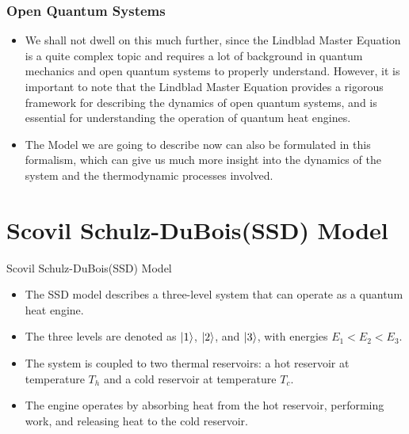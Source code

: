 \documentclass{beamer}
\begin{document}
    \begin{frame}
        \frametitle{Open Quantum Systems}
        \begin{itemize}
             \item We shall not dwell on this much further, since the Lindblad Master Equation is a quite complex topic and requires a lot of background in quantum mechanics and open quantum systems to properly understand. However, it is important to note that the Lindblad Master Equation provides a rigorous framework for describing the dynamics of open quantum systems, and is essential for understanding the operation of quantum heat engines.
             \item The Model we are going to describe now can also be formulated in this formalism, which can give us much more insight into the dynamics of the system and the thermodynamic processes involved.
        \end{itemize}
    \end{frame}



    \section{Scovil Schulz-DuBois(SSD) Model}

    \begin{frame}{Scovil Schulz-DuBois(SSD) Model}
        \begin{itemize}
            \item The SSD model describes a three-level system that can operate as a quantum heat engine. \pause
            \item The three levels are denoted as $\ket{1}$, $\ket{2}$, and $\ket{3}$, with energies $E_1 < E_2 < E_3$. \pause
            \item The system is coupled to two thermal reservoirs: a hot reservoir at temperature $T_h$ and a cold reservoir at temperature $T_c$. \pause
            \item The engine operates by absorbing heat from the hot reservoir, performing work, and releasing heat to the cold reservoir.
        \end{itemize}
    \end{frame}
\end{document}
